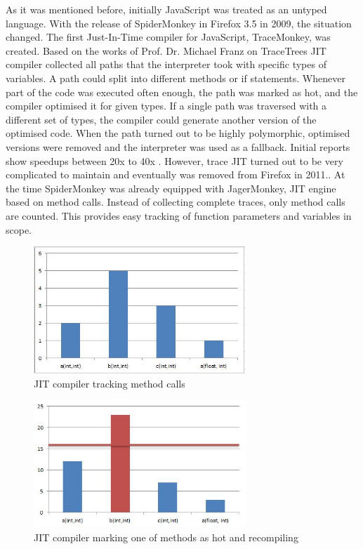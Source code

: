 As it was mentioned before, initially JavaScript was treated as an untyped language. With the release of SpiderMonkey in Firefox 3.5 in 2009, the situation changed. The first Just-In-Time compiler for JavaScript, TraceMonkey, was created. Based on the works of Prof. Dr. Michael Franz on TraceTrees \cite{Franz94code-generationon-the-fly:} JIT compiler collected all paths that the interpreter took with specific types of variables. A path could split into different methods or if statements. Whenever part of the code was executed often enough, the path was marked as hot, and the compiler optimised it for given types. If a single path was traversed with a different set of types, the compiler could generate another version of the optimised code. When the path turned out to be highly polymorphic, optimised versions were removed and the interpreter was used as a fallback.
Initial reports show speedups between 20x to 40x \cite{firefox-to-get-massive-javascript-performance-boost}.
However, trace JIT turned out to be very complicated to maintain \cite{improving-javascript-performance-with-jagermonkey} and eventually was removed from Firefox in 2011.\cite{trace-jit-removed-from-firefox}. At the time SpiderMonkey was already equipped with JagerMonkey, JIT engine based on method calls. Instead of collecting complete traces, only method calls are counted. This provides easy tracking of function parameters and variables in scope.

\begin{figure}[h!]
  \caption{JIT compiler tracking method calls}
  \label{img:jit-1}
  \centering
	\includegraphics[width=8cm]{jit-1}
\end{figure}


\begin{figure}[h!]
  \caption{JIT compiler marking one of methods as hot and recompiling}
  \label{img:jit-2}
  \centering
	\includegraphics[width=8cm]{jit-2}
\end{figure}

